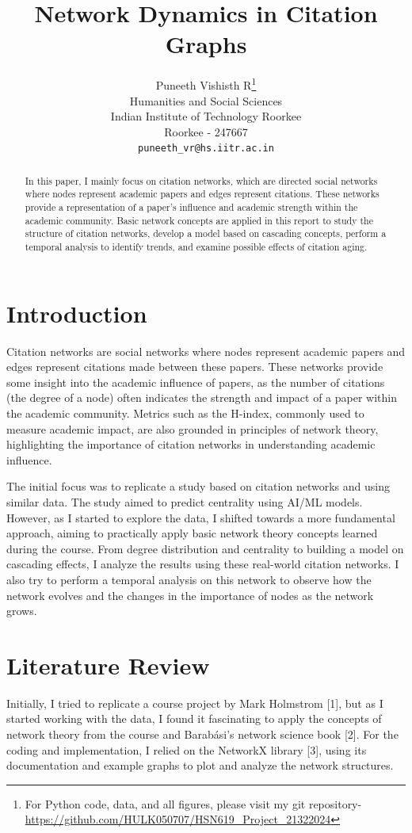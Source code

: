 \documentclass{article}
\title{Network Dynamics in Citation Graphs}
\author{
    Puneeth Vishisth R\thanks{For Python code, data, and all figures, please visit my git repository- \url{https://github.com/HULK050707/HSN619_Project_21322024}} \\
    Humanities and Social Sciences \\
    Indian Institute of Technology Roorkee \\
    Roorkee - 247667 \\
    \texttt{puneeth\_vr@hs.iitr.ac.in}
}
\begin{document}
\maketitle

\begin{abstract}
In this paper, I mainly focus on citation networks, which are directed social networks where nodes represent academic papers and edges represent citations. These networks provide a representation of a paper's influence and academic strength within the academic community. Basic network concepts are applied in this report to study the structure of citation networks, develop a model based on cascading concepts, perform a temporal analysis to identify trends, and examine possible effects of citation aging.
\end{abstract}

\section{Introduction}
\label{headings}
Citation networks are social networks where nodes represent academic papers and edges represent citations made between these papers. These networks provide some insight into the academic influence of papers, as the number of citations (the degree of a node) often indicates the strength and impact of a paper within the academic community. Metrics such as the H-index, commonly used to measure academic impact, are also grounded in principles of network theory, highlighting the importance of citation networks in understanding academic influence.

The initial focus was to replicate a study based on citation networks and using similar data. The study aimed to predict centrality using AI/ML models. However, as I started to explore the data, I shifted towards a more fundamental approach, aiming to practically apply basic network theory concepts learned during the course. From degree distribution and centrality to building a model on cascading effects, I analyze the results using these real-world citation networks. I also try to perform a temporal analysis on this network to observe how the network evolves and the changes in the importance of nodes as the network grows.

\section{Literature Review}
\label{headings}
Initially, I tried to replicate a course project by Mark Holmstrom [1], but as I started working with the data, I found it fascinating to apply the concepts of network theory from the course and Barabási's network science book [2]. For the coding and implementation, I relied on the NetworkX library [3], using its documentation and example graphs to plot and analyze the network structures.
\end{document}
